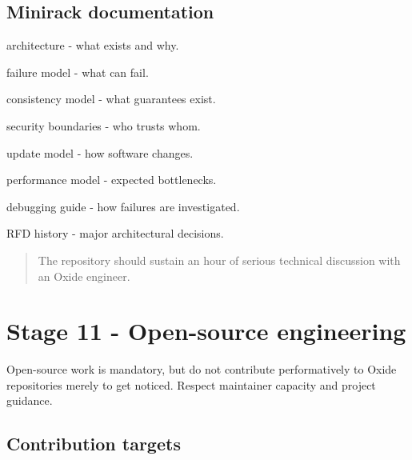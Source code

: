 \documentclass[11pt,letterpaper]{article}
\begin{document}
\subsection*{Minirack documentation}

\begin{topics}

\item architecture - what exists and why.

\item failure model - what can fail.

\item consistency model - what guarantees exist.

\item security boundaries - who trusts whom.

\item update model - how software changes.

\item performance model - expected bottlenecks.

\item debugging guide - how failures are investigated.

\item RFD history - major architectural decisions.

\end{topics}

\begin{quote}
The repository should sustain an hour of serious technical discussion with an Oxide engineer.
\end{quote}

\section{Stage 11 - Open-source engineering}\label{sec:15}

\label{stage:11}

Open-source work is mandatory, but do not contribute performatively to Oxide repositories merely to get noticed. Respect maintainer capacity and project guidance.

\subsection*{Contribution targets}
\end{document}
